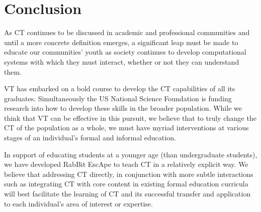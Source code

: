 \documentclass{acm_proc_article-sp}
\begin{document}
\section{Conclusion}
\label{sec:conclusion}
\sloppy As CT continues to be discussed in academic and professional communities and until a more concrete definition emerges, a significant leap must be made to educate our communities' youth as society continues to develop computational systems with which they must interact, whether or not they can understand them. 

VT has embarked on a bold course to develop the CT capabilities of all its graduates.
Simultaneously the US National Science Foundation is funding research into how to develop these skills in the broader population.
While we think that VT can be effective in this pursuit, we believe that to truly change the CT of the population as a whole, we must have myriad interventions at various stages of an individual's formal and informal education.

In support of educating students at a younger age (than undergraduate students), we have developed RabBit EscApe to teach CT in a relatively explicit way.
We believe that addressing CT directly, in conjunction with more subtle interactions such as integrating CT with core content in existing formal education curricula \cite{NSFCE21} will best facilitate the learning of CT and its successful transfer and application to each individual's area of interest or expertise.
\end{document}
